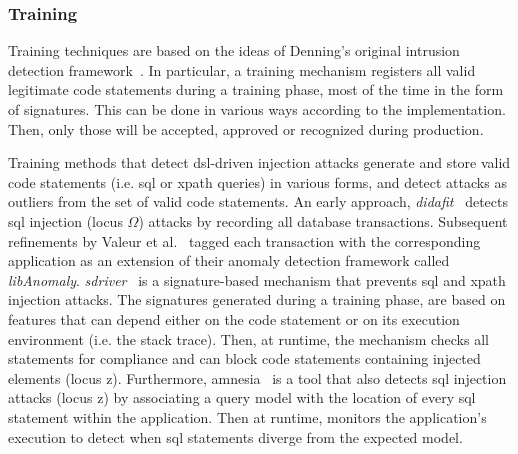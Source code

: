 \documentclass[conference]{IEEEtran}
\begin{document}

\subsubsection{Training}

Training techniques are based on the ideas of Denning's original
intrusion detection framework~\cite{Den87}. In particular, a training
mechanism registers all valid legitimate code statements during a
training phase, most of the time in the form of signatures. This can
be done in various ways according to the implementation. Then, only
those will be accepted, approved or recognized during production.

Training methods that detect {\sc dsl}-driven injection attacks
generate and store valid code statements (i.e. {\sc sql}
or {\sc xp}ath queries) in various forms, and detect attacks
as outliers from the set of valid code statements.
An early approach, {\it {\sc didafit}}~\cite{LLW02} detects
{\sc sql} injection (locus $\Omega$) attacks by recording all database transactions.
Subsequent refinements by Valeur et al.~\cite{VMV05}
tagged each transaction with the corresponding application
as an extension of their anomaly detection framework called
{\it libAnomaly}. {\it {\sc sd}river}~\cite{MS09,MKS09} is
a signature-based mechanism that prevents {\sc sql} and
{\sc xp}ath injection attacks. The signatures generated
during a training phase, are based on features that can
depend either on the code statement or on its execution
environment (i.e. the stack trace).
Then, at runtime, the mechanism checks all statements for compliance
and can block code statements containing injected elements (locus {\sc z}).
Furthermore, {\sc amnesia}~\cite{HO05,HO06,HO05b} is a tool
that also detects {\sc sql} injection attacks (locus {\sc z})
by associating a query model with the location of every
{\sc sql} statement within the application.
Then at runtime, monitors the application's execution to
detect when {\sc sql} statements diverge from the expected model.
\end{document}
